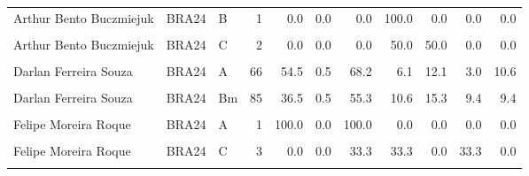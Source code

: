 \documentclass[
]{book}
\begin{document}
\begin{table}[!h]
{\begin{tabular}[t]{lllrrrrrrrr}
Arthur Bento Buczmiejuk & BRA24 & B & 1 & 0.0 & 0.0 & 0.0 & 100.0 & 0.0 & 0.0 & 0.0\\
\addlinespace
\cellcolor{gray!10}{Arthur Bento Buczmiejuk} & \cellcolor{gray!10}{BRA24} & \cellcolor{gray!10}{Bm} & \cellcolor{gray!10}{5} & \cellcolor{gray!10}{100.0} & \cellcolor{gray!10}{0.1} & \cellcolor{gray!10}{100.0} & \cellcolor{gray!10}{0.0} & \cellcolor{gray!10}{0.0} & \cellcolor{gray!10}{0.0} & \cellcolor{gray!10}{0.0}\\
Arthur Bento Buczmiejuk & BRA24 & C & 2 & 0.0 & 0.0 & 0.0 & 50.0 & 50.0 & 0.0 & 0.0\\
\cellcolor{gray!10}{Bruno Mossa Rezende} & \cellcolor{gray!10}{BRA24} & \cellcolor{gray!10}{A} & \cellcolor{gray!10}{3} & \cellcolor{gray!10}{0.0} & \cellcolor{gray!10}{0.0} & \cellcolor{gray!10}{0.0} & \cellcolor{gray!10}{0.0} & \cellcolor{gray!10}{100.0} & \cellcolor{gray!10}{0.0} & \cellcolor{gray!10}{0.0}\\
Darlan Ferreira Souza & BRA24 & A & 66 & 54.5 & 0.5 & 68.2 & 6.1 & 12.1 & 3.0 & 10.6\\
\cellcolor{gray!10}{Darlan Ferreira Souza} & \cellcolor{gray!10}{BRA24} & \cellcolor{gray!10}{B} & \cellcolor{gray!10}{64} & \cellcolor{gray!10}{59.4} & \cellcolor{gray!10}{0.4} & \cellcolor{gray!10}{67.2} & \cellcolor{gray!10}{6.2} & \cellcolor{gray!10}{18.8} & \cellcolor{gray!10}{3.1} & \cellcolor{gray!10}{4.7}\\
\addlinespace
Darlan Ferreira Souza & BRA24 & Bm & 85 & 36.5 & 0.5 & 55.3 & 10.6 & 15.3 & 9.4 & 9.4\\
\cellcolor{gray!10}{Darlan Ferreira Souza} & \cellcolor{gray!10}{BRA24} & \cellcolor{gray!10}{C} & \cellcolor{gray!10}{69} & \cellcolor{gray!10}{29.0} & \cellcolor{gray!10}{0.3} & \cellcolor{gray!10}{44.9} & \cellcolor{gray!10}{13.0} & \cellcolor{gray!10}{26.1} & \cellcolor{gray!10}{4.3} & \cellcolor{gray!10}{11.6}\\
Felipe Moreira Roque & BRA24 & A & 1 & 100.0 & 0.0 & 100.0 & 0.0 & 0.0 & 0.0 & 0.0\\
\cellcolor{gray!10}{Felipe Moreira Roque} & \cellcolor{gray!10}{BRA24} & \cellcolor{gray!10}{Bm} & \cellcolor{gray!10}{4} & \cellcolor{gray!10}{50.0} & \cellcolor{gray!10}{0.0} & \cellcolor{gray!10}{75.0} & \cellcolor{gray!10}{0.0} & \cellcolor{gray!10}{0.0} & \cellcolor{gray!10}{25.0} & \cellcolor{gray!10}{0.0}\\
Felipe Moreira Roque & BRA24 & C & 3 & 0.0 & 0.0 & 33.3 & 33.3 & 0.0 & 33.3 & 0.0\\
\addlinespace
\cellcolor{gray!10}{Fernando Gil Kreling} & \cellcolor{gray!10}{BRA24} & \cellcolor{gray!10}{A} & \cellcolor{gray!10}{1} & \cellcolor{gray!10}{100.0} & \cellcolor{gray!10}{0.0} & \cellcolor{gray!10}{100.0} & \cellcolor{gray!10}{0.0} & \cellcolor{gray!10}{0.0} & \cellcolor{gray!10}{0.0} & \cellcolor{gray!10}{0.0}\\

\end{tabular}}
\end{table}
\end{document}
